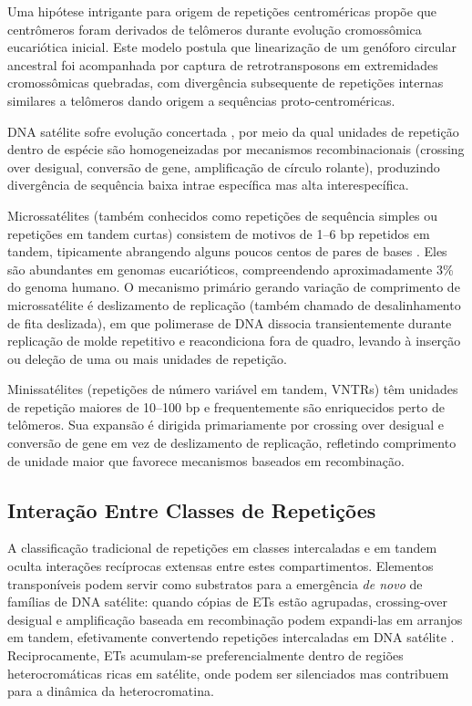 Uma hipótese intrigante para origem de repetições centroméricas propõe que centrômeros foram derivados de telômeros durante evolução cromossômica eucariótica inicial. Este modelo postula que linearização de um genóforo circular ancestral foi acompanhada por captura de retrotransposons em extremidades cromossômicas quebradas, com divergência subsequente de repetições internas similares a telômeros dando origem a sequências proto-centroméricas.

DNA satélite sofre evolução concertada \parencite{dover1982}, por meio da qual unidades de repetição dentro de espécie são homogeneizadas por mecanismos recombinacionais (crossing over desigual, conversão de gene, amplificação de círculo rolante), produzindo divergência de sequência baixa intrae específica mas alta interespecífica.

Microssatélites (também conhecidos como repetições de sequência simples ou repetições em tandem curtas) consistem de motivos de 1--6 bp repetidos em tandem, tipicamente abrangendo alguns poucos centos de pares de bases \parencite{ellegren2004}. Eles são abundantes em genomas eucarióticos, compreendendo aproximadamente 3\% do genoma humano. O mecanismo primário gerando variação de comprimento de microssatélite é deslizamento de replicação (também chamado de desalinhamento de fita deslizada), em que polimerase de DNA dissocia transientemente durante replicação de molde repetitivo e reacondiciona fora de quadro, levando à inserção ou deleção de uma ou mais unidades de repetição.

Minissatélites (repetições de número variável em tandem, VNTRs) têm unidades de repetição maiores de 10--100 bp e frequentemente são enriquecidos perto de telômeros. Sua expansão é dirigida primariamente por crossing over desigual e conversão de gene em vez de deslizamento de replicação, refletindo comprimento de unidade maior que favorece mecanismos baseados em recombinação.

\subsection{Interação Entre Classes de Repetições}

A classificação tradicional de repetições em classes intercaladas e em tandem oculta interações recíprocas extensas entre estes compartimentos. Elementos transponíveis podem servir como substratos para a emergência \textit{de novo} de famílias de DNA satélite: quando cópias de ETs estão agrupadas, crossing-over desigual e amplificação baseada em recombinação podem expandi-las em arranjos em tandem, efetivamente convertendo repetições intercaladas em DNA satélite \parencite{mestrovic2015}. Reciprocamente, ETs acumulam-se preferencialmente dentro de regiões heterocromáticas ricas em satélite, onde podem ser silenciados mas contribuem para a dinâmica da heterocromatina.

